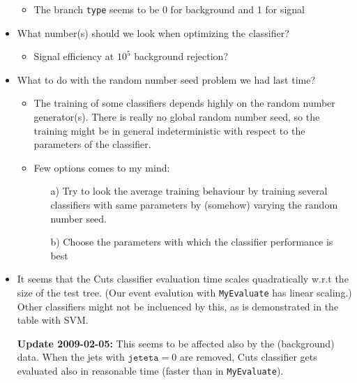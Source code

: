 \begin{itemize}
\begin{itemize}
  \item The branch \texttt{type} seems to be 0 for background and 1 for signal
  \end{itemize}
\item What number(s) should we look when optimizing the classifier?
  \begin{itemize}
  \item Signal efficiency at $10^5$ background rejection?
  \end{itemize}
\item What to do with the random number seed problem we had last time?
  \begin{itemize}
  \item The training of some classifiers depends highly on the random
    number generator(s). There is really no global random number seed,
    so the training might be in general indeterministic with respect
    to the parameters of the classifier.
  \item Few options comes to my mind:
    \begin{itemize}
    \item[a)] Try to look the average training behaviour by training
      several classifiers with same parameters by (somehow) varying
      the random number seed.
    \item[b)] Choose the parameters with which the classifier
      performance is best
    \end{itemize}
  \end{itemize}
\item It seems that the Cuts classifier evaluation time scales
  quadratically w.r.t the size of the test tree. (Our event evalution
  with \texttt{MyEvaluate} has linear scaling.)%
  Other classifiers might not be incluenced by this, as is
  demonstrated in the table with SVM.

  \textbf{Update 2009-02-05:} This seems to be affected also by the
  (background) data. When the jets with $\texttt{jeteta}=0$ are
  removed, Cuts classifier gets evaluated also in reasonable time
  (faster than in \texttt{MyEvaluate}).
\end{itemize}

